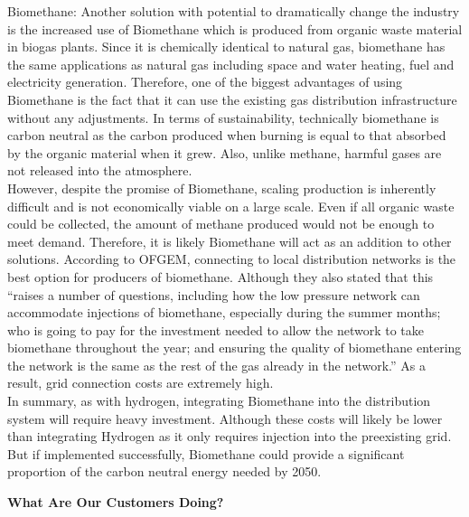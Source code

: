 \documentclass[11pt]{article}		%
\begin{document}
            Biomethane: 
            Another solution with potential to dramatically change the industry is the increased use of Biomethane which is produced from organic waste material in biogas plants. Since it is chemically identical to natural gas, biomethane has the same applications as natural gas including space and water heating, fuel and electricity generation. Therefore, one of the biggest advantages of using Biomethane is the fact that it can use the existing gas distribution infrastructure without any adjustments. In terms of sustainability, technically biomethane is carbon neutral as the carbon produced when burning is equal to that absorbed by the organic material when it grew. Also, unlike methane, harmful gases are not released into the atmosphere.\\
    	    \hspace*{3ex}However, despite the promise of Biomethane, scaling production is inherently difficult and is not economically viable on a large scale. Even if all organic waste could be collected, the amount of methane produced would not be enough to meet demand. Therefore, it is likely Biomethane will act as an addition to other solutions. According to OFGEM, connecting to local distribution networks is the best option for producers of biomethane. Although they also stated that this “raises a number of questions, including how the low pressure network can accommodate injections of biomethane, especially during the summer months; who is going to pay for the investment needed to allow the network to take biomethane throughout the year; and ensuring the quality of biomethane entering the network is the same as the rest of the gas already in the network.” As a result, grid connection costs are extremely high.\\
        	\hspace*{3ex}In summary, as with hydrogen, integrating Biomethane into the distribution system will require heavy investment. Although these costs will likely be lower than integrating Hydrogen as it only requires injection into the preexisting grid. But if implemented successfully, Biomethane could provide a significant proportion of the carbon neutral energy needed by 2050.
    
    		\textbf{What Are Our Customers Doing?}\\
    		
\end{document}

